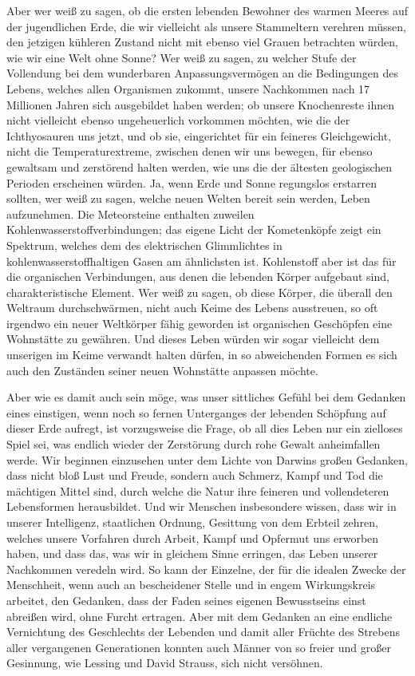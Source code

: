 \documentclass[a4paper, 11pt, oneside, german]{article}
\begin{document}
Aber wer weiß zu sagen, ob die ersten lebenden Bewohner des warmen Meeres auf der jugendlichen Erde, die wir vielleicht als unsere Stammeltern verehren müssen, den jetzigen kühleren Zustand nicht mit ebenso viel Grauen betrachten würden, wie wir eine Welt ohne Sonne? Wer weiß zu sagen, zu welcher Stufe der Vollendung bei dem wunderbaren Anpassungsvermögen an die Bedingungen des Lebens, welches allen Organismen zukommt, unsere Nachkommen nach 17 Millionen Jahren sich ausgebildet haben werden; ob unsere Knochenreste ihnen nicht vielleicht ebenso ungeheuerlich vorkommen möchten, wie die der Ichthyosauren uns jetzt, und ob sie, eingerichtet für ein feineres Gleichgewicht, nicht die Temperaturextreme, zwischen denen wir uns bewegen, für ebenso gewaltsam und zerstörend halten werden, wie uns die der ältesten geologischen Perioden erscheinen würden. Ja, wenn Erde und Sonne regungslos erstarren sollten, wer weiß zu sagen, welche neuen Welten bereit sein werden, Leben aufzunehmen. Die Meteorsteine enthalten zuweilen Kohlenwasserstoffverbindungen; das eigene Licht der Kometenköpfe zeigt ein Spektrum, welches dem des elektrischen Glimmlichtes in kohlenwasserstoffhaltigen Gasen am ähnlichsten ist. Kohlenstoff aber ist das für die organischen Verbindungen, aus denen die lebenden Körper aufgebaut sind, charakteristische Element. Wer weiß zu sagen, ob diese Körper, die überall den Weltraum durchschwärmen, nicht auch Keime des Lebens ausstreuen, so oft irgendwo ein neuer Weltkörper fähig geworden ist organischen Geschöpfen eine Wohnstätte zu gewähren. Und dieses Leben würden wir sogar vielleicht dem unserigen im Keime verwandt halten dürfen, in so abweichenden Formen es sich auch den Zuständen seiner neuen Wohnstätte anpassen möchte.

Aber wie es damit auch sein möge, was unser sittliches Gefühl bei dem Gedanken eines einstigen, wenn noch so fernen Unterganges der lebenden Schöpfung auf dieser Erde aufregt, ist vorzugsweise die Frage, ob all dies Leben nur ein zielloses Spiel sei, was endlich wieder der Zerstörung durch rohe Gewalt anheimfallen werde. Wir beginnen einzusehen unter dem Lichte von Darwins großen Gedanken, dass nicht bloß Lust und Freude, sondern auch Schmerz, Kampf und Tod die mächtigen Mittel sind, durch welche die Natur ihre feineren und vollendeteren Lebensformen herausbildet. Und wir Menschen insbesondere wissen, dass wir in unserer Intelligenz, staatlichen Ordnung, Gesittung von dem Erbteil zehren, welches unsere Vorfahren durch Arbeit, Kampf und Opfermut uns erworben haben, und dass das, was wir in gleichem Sinne erringen, das Leben unserer Nachkommen veredeln wird. So kann der Einzelne, der für die idealen Zwecke der Menschheit, wenn auch an bescheidener Stelle und in engem Wirkungskreis arbeitet, den Gedanken, dass der Faden seines eigenen Bewusstseins einst abreißen wird, ohne Furcht ertragen. Aber mit dem Gedanken an eine endliche Vernichtung des Geschlechts der Lebenden und damit aller Früchte des Strebens aller vergangenen Generationen konnten auch Männer von so freier und großer Gesinnung, wie Lessing und David Strauss, sich nicht versöhnen.
\end{document}
